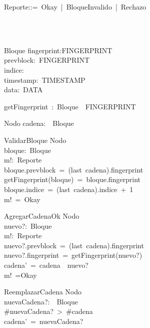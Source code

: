 \begin{zed}
Reporte::=~Okay~|~BloqueInvalido~|~Rechazo~\\
\\
\end{zed}
\begin{zed}
\\
\end{zed}
\begin{schema}{Bloque}
fingerprint:FINGERPRINT\\
prevblock:~FINGERPRINT\\
indice:~\nat\\
timestamp:~TIMESTAMP\\
data:~DATA\\
\end{schema}
\begin{axdef}
getFingerprint~:~Bloque~\fun~FINGERPRINT\\
\end{axdef}
\begin{schema}{Nodo}
cadena:~\seq~Bloque\\
\end{schema}
\begin{schema}{ValidarBloque}
\Xi Nodo\\
bloque:~Bloque\\
m!:~Reporte\\
\where
bloque.prevblock~=~(last~cadena).fingerprint\\
getFingerprint(bloque)~=~bloque.fingerprint\\
bloque.indice~=~(last~cadena).indice~+~1\\
m!~=~Okay\\
\end{schema}
\begin{schema}{AgregarCadenaOk}
\Delta Nodo\\
nuevo?:~Bloque\\
m!:~Reporte\\
\where
nuevo?.prevblock~=~(last~cadena).fingerprint\\
nuevo?.fingerprint~=~getFingerprint(nuevo?)\\
cadena'~=~cadena~\cat~\langle nuevo?\rangle\\
m!~=Okay\\
\end{schema}
\begin{schema}{ReemplazarCadena}
\Delta Nodo\\
nuevaCadena?:~\seq~Bloque\\
\where
\#nuevaCadena?~>~\#cadena\\
cadena'~=~nuevaCadena?\\
\end{schema}
